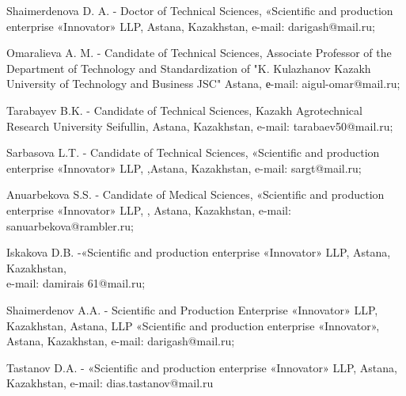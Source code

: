 \begin{noparindent}

Shaimerdenova D. A. - Doctor of Technical Sciences, «Scientific and
production enterprise «Innovator» LLP, Astana, Kazakhstan, e-mail:
darigash@mail.ru;

Omaralieva A. M. - Candidate of Technical Sciences, Associate Professor
of the Department of Technology and Standardization of "K. Kulazhanov
Kazakh University of Technology and Business JSC" Astana, е-mail:
aigul-omar@mail.ru;

Tarabayev B.K. - Candidate of Technical Sciences, Kazakh Agrotechnical
Research University Seifullin, Astana, Kazakhstan, e-mail:
tarabaev50@mail.ru;

Sarbasova L.T. - Candidate of Technical Sciences, «Scientific and
production enterprise «Innovator» LLP, ,Astana, Kazakhstan, e-mail:
sargt@mail.ru;

Anuarbekova S.S. - Candidate of Medical Sciences, «Scientific and
production enterprise «Innovator» LLP, , Astana, Kazakhstan, e-mail:
sanuarbekova@rambler.ru;

Iskakova D.B. -«Scientific and production enterprise «Innovator» LLP,
Astana, Kazakhstan,\\e-mail: damirais 61@mail.ru;

Shaimerdenov A.A. - Scientific and Production Enterprise «Innovator»
LLP, Kazakhstan, Astana, LLP «Scientific and production enterprise
«Innovator», Astana, Kazakhstan, e-mail: darigash@mail.ru;

Tastanov D.A. - «Scientific and production enterprise «Innovator» LLP,
Astana, Kazakhstan, e-mail: dias.tastanov@mail.ru


\end{noparindent}







